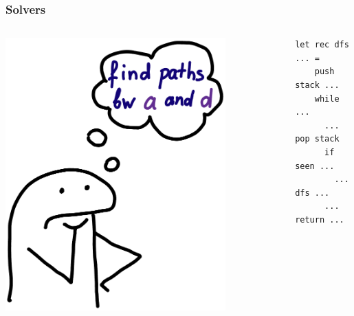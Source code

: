 \documentclass[xcolor={dvipsnames}, aspectratio=169]{beamer}
\begin{document}
\begin{frame}[fragile]
  \frametitle{Solvers}
  \begin{columns}    
    \begin{column}{0.35\textwidth}
      \centering
      \includegraphics[width=0.8\textwidth]{pic/solver.jpg}
    \end{column}
    \begin{column}{0.75\textwidth} 
      \begin{center}
        \begin{minipage}{0.82\textwidth}
      \begin{lstlisting}[language=ocanren]
  let rec dfs ... = 
    push stack ... 
    while ...
      ... pop stack 
      if seen ...
        ... dfs ...  
      ... return ... 
      \end{lstlisting}
    \end{minipage}
  \end{center}      
    \end{column}
  \end{columns}
\end{frame}
\end{document}
